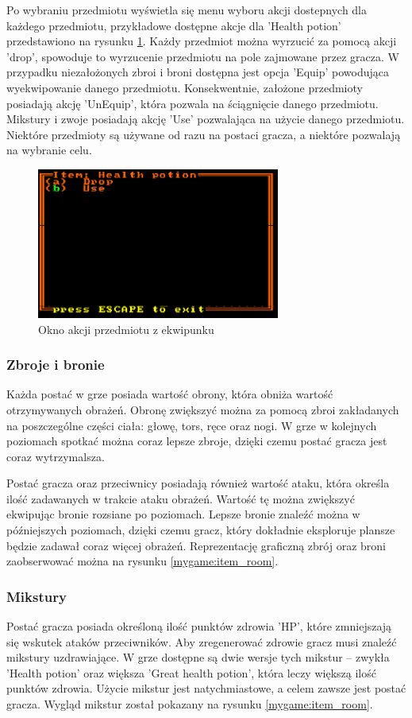 \documentclass[12pt,twoside]{article}
\begin{document}
Po wybraniu przedmiotu wyświetla się menu wyboru akcji dostepnych dla każdego przedmiotu, przykładowe dostępne akcje dla 'Health potion' przedstawiono na rysunku \ref{mygame:item_menu}. Każdy przedmiot można wyrzucić za pomocą akcji 'drop', spowoduje to wyrzucenie przedmiotu na pole zajmowane przez gracza. W przypadku niezałożonych zbroi i broni dostępna jest opcja 'Equip' powodująca wyekwipowanie danego przedmiotu. Konsekwentnie, założone przedmioty posiadają akcję 'UnEquip', która pozwala na ściągnięcie danego przedmiotu. Mikstury i zwoje posiadają akcję 'Use' pozwalająca na użycie danego przedmiotu. Niektóre przedmioty są używane od razu na postaci gracza, a niektóre pozwalają na wybranie celu.

\FloatBarrier
\begin{figure}[h]
	\centering
	\includegraphics[width=8cm]{images/mygame/item_menu.png}
	\caption{Okno akcji przedmiotu z ekwipunku}
	\label{mygame:item_menu}
\end{figure}
\FloatBarrier


\subsubsection{Zbroje i bronie}
Każda postać w grze posiada wartość obrony, która obniża wartość otrzymywanych obrażeń. Obronę zwiększyć można za pomocą zbroi zakładanych na poszczególne części ciała: głowę, tors, ręce oraz nogi. W grze w kolejnych poziomach spotkać można coraz lepsze zbroje, dzięki czemu postać gracza jest coraz wytrzymalsza.

Postać gracza oraz przeciwnicy posiadają również wartość ataku, która określa ilość zadawanych w trakcie ataku obrażeń. Wartość tę można zwiększyć ekwipując bronie rozsiane po poziomach. Lepsze bronie znaleźć można w późniejszych poziomach, dzięki czemu gracz, który dokładnie eksploruje plansze będzie zadawał coraz więcej obrażeń. Reprezentację graficzną zbrój oraz broni zaobserwować można na rysunku \ref{mygame:item_room}.


\subsubsection{Mikstury}
Postać gracza posiada określoną ilość punktów zdrowia 'HP', które zmniejszają się wskutek ataków przeciwników. Aby zregenerować zdrowie gracz musi znaleźć mikstury uzdrawiające. W grze dostępne są dwie wersje tych mikstur -- zwykła 'Health potion' oraz większa 'Great health potion', która leczy większą ilość punktów zdrowia. Użycie mikstur jest natychmiastowe, a celem zawsze jest postać gracza. Wygląd mikstur został pokazany na rysunku \ref{mygame:item_room}.
\end{document}
